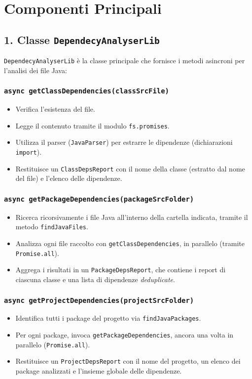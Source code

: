 \documentclass[a4paper,12pt]{article}
\begin{document}
\section{Componenti Principali}
\subsection{1. Classe \texttt{DependecyAnalyserLib}}
\label{sec:analyserlib}
\texttt{DependecyAnalyserLib} \`e la classe principale che fornisce i metodi asincroni per l'analisi dei file Java:

\subsubsection*{\texttt{async getClassDependencies(classSrcFile)}}
\begin{itemize}
  \item Verifica l'esistenza del file.
  \item Legge il contenuto tramite il modulo \texttt{fs.promises}.
  \item Utilizza il parser (\texttt{JavaParser}) per estrarre le dipendenze (dichiarazioni \texttt{import}).
  \item Restituisce un \texttt{ClassDepsReport} con il nome della classe (estratto dal nome del file) e l'elenco delle dipendenze.
\end{itemize}

\subsubsection*{\texttt{async getPackageDependencies(packageSrcFolder)}}
\begin{itemize}
  \item Ricerca ricorsivamente i file Java all'interno della cartella indicata, tramite il metodo \texttt{findJavaFiles}.
  \item Analizza ogni file raccolto con \texttt{getClassDependencies}, in parallelo (tramite \texttt{Promise.all}).
  \item Aggrega i risultati in un \texttt{PackageDepsReport}, che contiene i report di ciascuna classe e una lista di dipendenze \emph{deduplicate}.
\end{itemize}

\subsubsection*{\texttt{async getProjectDependencies(projectSrcFolder)}}
\begin{itemize}
  \item Identifica tutti i package del progetto via \texttt{findJavaPackages}.
  \item Per ogni package, invoca \texttt{getPackageDependencies}, ancora una volta in parallelo (\texttt{Promise.all}).
  \item Restituisce un \texttt{ProjectDepsReport} con il nome del progetto, un elenco dei package analizzati e l'insieme globale delle dipendenze.
\end{itemize}
\end{document}
